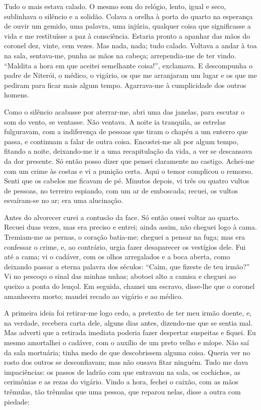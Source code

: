 Tudo o mais estava calado. O mesmo som do relógio, lento, igual e seco,
sublinhava o silêncio e a solidão. Colava a orelha à porta do quarto na
esperança de ouvir um gemido, uma palavra, uma injúria, qualquer coisa
que significasse a vida e me restituísse a paz à consciência. Estaria
pronto a apanhar das mãos do coronel dez, vinte, cem vezes. Mas nada,
nada; tudo calado. Voltava a andar à toa na sala, sentava-me, punha as
mãos na cabeça; arrependia-me de ter vindo. ``Maldita a hora em que
aceitei semelhante coisa!'', exclamava. E descompunha o padre de
Niterói, o médico, o vigário, os que me arranjaram um lugar e os que me
pediram para ficar mais algum tempo. Agarrava-me à cumplicidade dos
outros homens.

Como o silêncio acabasse por aterrar-me, abri uma das janelas, para
escutar o som do vento, se ventasse. Não ventava. A noite ia tranquila,
as estrelas fulguravam, com a indiferença de pessoas que tiram o chapéu
a um enterro que passa, e continuam a falar de outra coisa. Encostei-me
ali por algum tempo, fitando a noite, deixando-me ir a uma recapitulação
da vida, a ver se descansava da dor presente. Só então posso dizer que
pensei claramente no castigo. Achei-me com um crime às costas e vi a
punição certa. Aqui o temor complicou o remorso. Senti que os cabelos me
ficavam de pé. Minutos depois, vi três ou quatro vultos de pessoas, no
terreiro espiando, com um ar de emboscada; recuei, os vultos esvaíram-se
no ar; era uma alucinação.

Antes do alvorecer curei a contusão da face. Só então ousei voltar ao
quarto. Recuei duas vezes, mas era preciso e entrei; ainda assim, não
cheguei logo à cama. Tremiam-me as pernas, o coração batia-me; cheguei a
pensar na fuga; mas era confessar o crime, e, ao contrário, urgia fazer
desaparecer os vestígios dele. Fui até a cama; vi o cadáver, com os
olhos arregalados e a boca aberta, como deixando passar a eterna palavra
dos séculos: ``Caim, que fizeste de teu irmão?'' Vi no pescoço o sinal
das minhas unhas; abotoei alto a camisa e cheguei ao queixo a ponta do
lençol. Em seguida, chamei um escravo, disse-lhe que o coronel
amanhecera morto; mandei recado ao vigário e ao médico.

A primeira ideia foi retirar-me logo cedo, a pretexto de ter meu irmão
doente, e, na verdade, recebera carta dele, alguns dias antes,
dizendo-me que se sentia mal. Mas adverti que a retirada imediata
poderia fazer despertar suspeitas e fiquei. Eu mesmo amortalhei o
cadáver, com o auxílio de um preto velho e míope. Não saí da sala
mortuária; tinha medo de que descobrissem alguma coisa. Queria ver no
rosto dos outros se desconfiavam; mas não ousava fitar ninguém. Tudo me
dava impaciências: os passos de ladrão com que entravam na sala, os
cochichos, as cerimônias e as rezas do vigário. Vindo a hora, fechei o
caixão, com as mãos trêmulas, tão trêmulas que uma pessoa, que reparou
nelas, disse a outra com piedade:

